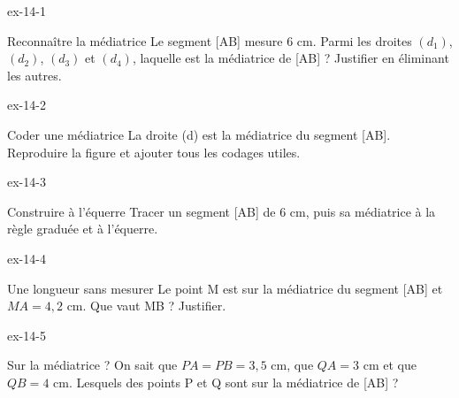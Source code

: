 \clearpage{}
\begin{blocLivre}{ex-14-1}\begin{exercice}[1]{Reconnaître la médiatrice}
Le segment [AB] mesure 6 cm. Parmi les droites $(d_1)$, $(d_2)$, $(d_3)$ et $(d_4)$, laquelle est la médiatrice de [AB] ? Justifier en éliminant les autres.
\label{fig-ex-14-1}
\end{exercice}\end{blocLivre}
\begin{blocLivre}{ex-14-2}\begin{exercice}[1]{Coder une médiatrice}
La droite (d) est la médiatrice du segment [AB]. Reproduire la figure et ajouter tous les codages utiles.
\label{fig-ex-14-2}
\end{exercice}\end{blocLivre}
\begin{blocLivre}{ex-14-3}\begin{exercice}[1]{Construire à l’équerre}
Tracer un segment [AB] de 6 cm, puis sa médiatrice à la règle graduée et à l’équerre.
\label{fig-ex-14-3}
\end{exercice}\end{blocLivre}
\begin{blocLivre}{ex-14-4}\begin{exercice}[1]{Une longueur sans mesurer}
Le point M est sur la médiatrice du segment [AB] et $MA=4{,}2$ cm. Que vaut MB ? Justifier.
\label{fig-ex-14-4}
\end{exercice}\end{blocLivre}
\begin{blocLivre}{ex-14-5}\begin{exercice}[1]{Sur la médiatrice ?}
On sait que $PA=PB=3{,}5$ cm, que $QA=3$ cm et que $QB=4$ cm. Lesquels des points P et Q sont sur la médiatrice de [AB] ?
\label{fig-ex-14-5}
\end{exercice}\end{blocLivre}

